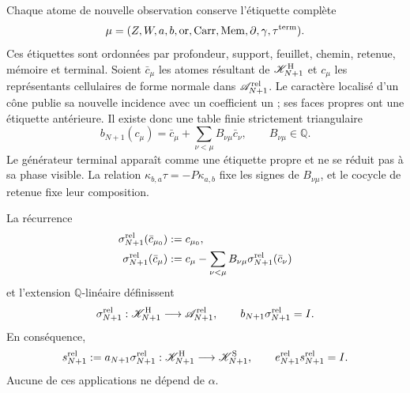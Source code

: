 Chaque atome de nouvelle observation conserve l'étiquette complète
\[
 \mu=(Z,W,a,b,\operatorname{or},\operatorname{Carr},
       \operatorname{Mem},\partial,\gamma,\tau^{\rm term}).
\]
Ces étiquettes sont ordonnées par profondeur, support, feuillet, chemin, retenue,
mémoire et terminal. Soient $\bar c_\mu$ les atomes résultant de
$\mathscr K^{\rm H}_{N+1}$ et $c_\mu$ les représentants cellulaires de
forme normale dans $\mathscr A_{N+1}^{\rm rel}$. Le caractère localisé d'un
cône publie sa nouvelle incidence avec un coefficient un ; ses faces propres
ont une étiquette antérieure. Il existe donc une table finie strictement
triangulaire
\begin{equation}\label{eq:pdf2-hodge-tabla-triangular}
 b_{N+1}(c_\mu)
 =\bar c_\mu+\sum_{\nu<\mu}B_{\nu\mu}\bar c_\nu,
 \qquad B_{\nu\mu}\in\mathbb Q.
\end{equation}
Le générateur terminal apparaît comme une étiquette propre et ne se réduit pas à sa
phase visible. La relation
$\kappa_{b,a}\tau=-P\kappa_{a,b}$ fixe les signes de
$B_{\nu\mu}$, et le cocycle de retenue fixe leur composition.

\begin{proposition}
\label{prop:pdf2-hodge-seccion-relativa}
La récurrence
\begin{equation}\label{eq:pdf2-hodge-sigma-recursiva}
 \begin{aligned}
  \sigma_{N+1}^{\rm rel}(\bar c_{\mu_0})&:=c_{\mu_0},\\
  \sigma_{N+1}^{\rm rel}(\bar c_\mu)&:=
  c_\mu-\sum_{\nu<\mu}B_{\nu\mu}
             \sigma_{N+1}^{\rm rel}(\bar c_\nu)
 \end{aligned}
\end{equation}
et l'extension $\mathbb Q$-linéaire définissent
\begin{equation}\label{eq:pdf2-hodge-sigma-right-inverse}
 \sigma_{N+1}^{\rm rel}:\mathscr K^{\rm H}_{N+1}\longrightarrow
 \mathscr A_{N+1}^{\rm rel},
 \qquad b_{N+1}\sigma_{N+1}^{\rm rel}=I.
\end{equation}
En conséquence,
\begin{equation}\label{eq:pdf2-hodge-right-inverse}
 s_{N+1}^{\rm rel}:=a_{N+1}\sigma_{N+1}^{\rm rel}:
 \mathscr K^{\rm H}_{N+1}\longrightarrow\mathscr K^{\rm S}_{N+1},
 \qquad e_{N+1}^{\rm rel}s_{N+1}^{\rm rel}=I.
\end{equation}
Aucune de ces applications ne dépend de $\alpha$.
\end{proposition}

